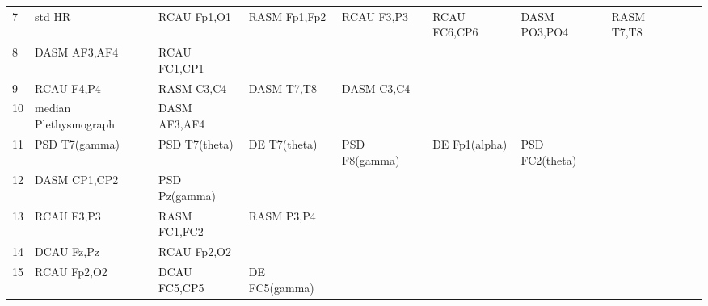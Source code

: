 \begin{landscape}
\begin{table}[]
\begin{tabular}{l|llllllll}
7        & std HR                & RCAU Fp1,O1           & RASM Fp1,Fp2         & RCAU F3,P3              & RCAU FC6,CP6            & DASM PO3,PO4         & RASM T7,T8           &                       &                       &                    \\
8        & DASM AF3,AF4          & RCAU FC1,CP1          &                      &                         &                         &                      &                      &                       &                       &                    \\
9        & RCAU F4,P4            & RASM C3,C4            & DASM T7,T8           & DASM C3,C4              &                         &                      &                      &                       &                       &                    \\
10       & median Plethysmograph & DASM AF3,AF4          &                      &                         &                         &                      &                      &                       &                       &                    \\
11       & PSD T7(gamma)         & PSD T7(theta)         & DE T7(theta)         & PSD F8(gamma)           & DE Fp1(alpha)           & PSD FC2(theta)       &                      &                       &                       &                    \\
12       & DASM CP1,CP2          & PSD Pz(gamma)         &                      &                         &                         &                      &                      &                       &                       &                    \\
13       & RCAU F3,P3            & RASM FC1,FC2          & RASM P3,P4           &                         &                         &                      &                      &                       &                       &                    \\
14       & DCAU Fz,Pz            & RCAU Fp2,O2           &                      &                         &                         &                      &                      &                       &                       &                    \\
15       & RCAU Fp2,O2           & DCAU FC5,CP5          & DE FC5(gamma)        &                         &                         &                      &                      &                       &                       &                    \\

\end{tabular}
\end{table}
\end{landscape}
